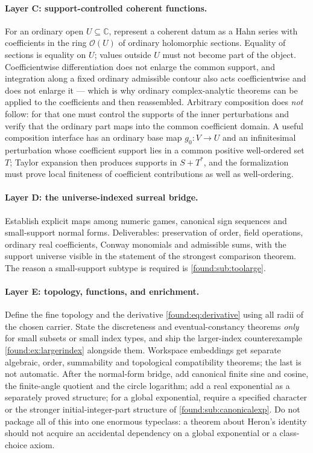 \documentclass[11pt,letterpaper]{article}
\numberwithin{equation}{section}
\theoremstyle{definition}
\theoremstyle{remark}
\newcommand{\C}{\mathbb C}
\newcommand{\OO}{\mathcal O}
\begin{document}
\paragraph{Layer C: support-controlled coherent functions.} For an ordinary open
$U\subseteq\C$, represent a coherent datum as a Hahn series with coefficients in
the ring $\OO(U)$ of ordinary holomorphic sections. Equality of sections is
equality on $U$; values outside $U$ must not become part of the object.
Coefficientwise differentiation does not enlarge the common support, and
integration along a fixed ordinary admissible contour also acts coefficientwise
and does not enlarge it --- which is why ordinary complex-analytic theorems can
be applied to the coefficients and then reassembled. Arbitrary composition does
\emph{not} follow: for that one must control the supports of the inner
perturbations and verify that the ordinary part maps into the common coefficient
domain. A useful composition interface has an ordinary base map $g_0:V\to U$ and
an infinitesimal perturbation whose coefficient support lies in a common positive
well-ordered set $T$; Taylor expansion then produces supports in $S+T^*$, and
the formalization must prove local finiteness of coefficient contributions as
well as well-ordering.

\paragraph{Layer D: the universe-indexed surreal bridge.} Establish explicit maps
among numeric games, canonical sign sequences and small-support normal forms.
Deliverables: preservation of order, field operations, ordinary real
coefficients, Conway monomials and admissible sums, with the support universe
visible in the statement of the strongest comparison theorem. The reason a
small-support subtype is required is \cref{found:sub:toolarge}.

\paragraph{Layer E: topology, functions, and enrichment.} Define the fine
topology and the derivative \eqref{found:eq:derivative} using all radii of the
chosen carrier. State the discreteness and eventual-constancy theorems
\emph{only} for small subsets or small index types, and ship the larger-index
counterexample \cref{found:ex:largerindex} alongside them. Workspace embeddings
get separate algebraic, order, summability and topological compatibility
theorems; the last is not automatic. After the normal-form bridge, add canonical
finite sine and cosine, the finite-angle quotient and the circle logarithm; add
a real exponential as a separately proved structure; for a global exponential,
require a specified character or the stronger initial-integer-part structure of
\cref{found:sub:canonicalexp}. Do not package all of this into one enormous
typeclass: a theorem about Heron's identity should not acquire an accidental
dependency on a global exponential or a class-choice axiom.
\end{document}
